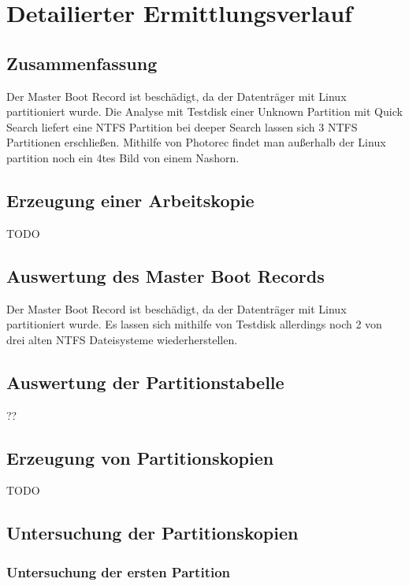 \chapter{Detailierter Ermittlungsverlauf}

\section{Zusammenfassung}

Der Master Boot Record ist beschädigt, da der Datenträger mit Linux partitioniert wurde. Die Analyse mit Testdisk einer Unknown Partition mit Quick Search liefert eine NTFS Partition bei deeper Search lassen sich 3 NTFS Partitionen erschließen.  Mithilfe von Photorec findet man außerhalb der Linux partition noch ein 4tes Bild von einem Nashorn. 

\section{Erzeugung einer Arbeitskopie}

TODO

\section{Auswertung des Master Boot Records}

Der Master Boot Record ist beschädigt, da der Datenträger mit Linux partitioniert wurde. Es lassen sich mithilfe von Testdisk allerdings noch 2 von drei alten NTFS Dateisysteme wiederherstellen.

\section{Auswertung der Partitionstabelle}
??
\section{Erzeugung von Partitionskopien}

TODO

\section{Untersuchung der Partitionskopien}

\subsection{Untersuchung der ersten Partition}


